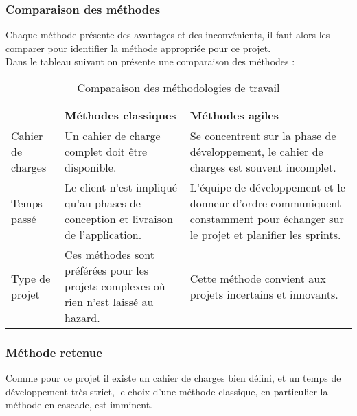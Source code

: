\subsubsection{Comparaison des méthodes}
Chaque méthode présente des avantages et des inconvénients, il faut alors les comparer pour identifier la méthode appropriée pour ce projet.\\
\noindent Dans le tableau suivant on présente une comparaison des méthodes :\\
\begin{table}[H]
    \begin{center}
        \begin{tabularx}{0.8\textwidth} {
                | >{\centering\arraybackslash}X
                | >{\centering\arraybackslash}X
                | >{\centering\arraybackslash}X |}
            \hline
                              & Méthodes classiques                                                                    & Méthodes agiles                                                                                                                \\
            \hline
            Cahier de charges & Un cahier de charge complet doit être disponible.                                      & Se concentrent sur la phase de développement, le cahier de charges est souvent incomplet.                                      \\
            \hline
            Temps passé       & Le client n'est impliqué qu'au phases de conception et livraison de l'application.     & L'équipe de développement et le donneur d'ordre communiquent constamment pour échanger sur le projet et planifier les sprints. \\
            \hline
            Type de projet    & Ces méthodes sont préférées pour les projets complexes où rien n'est laissé au hazard. & Cette méthode convient aux projets incertains et innovants.                                                                    \\
            \hline
        \end{tabularx}
        \captionsetup{justification=centering}
        \caption{Comparaison des méthodologies de travail}
        \label{tab:meth_compare}
    \end{center}
\end{table}
\subsubsection{Méthode retenue}
Comme pour ce projet il existe un cahier de charges bien défini, et un temps de développement très strict, le choix d'une méthode classique, en particulier la méthode en cascade, est imminent.

